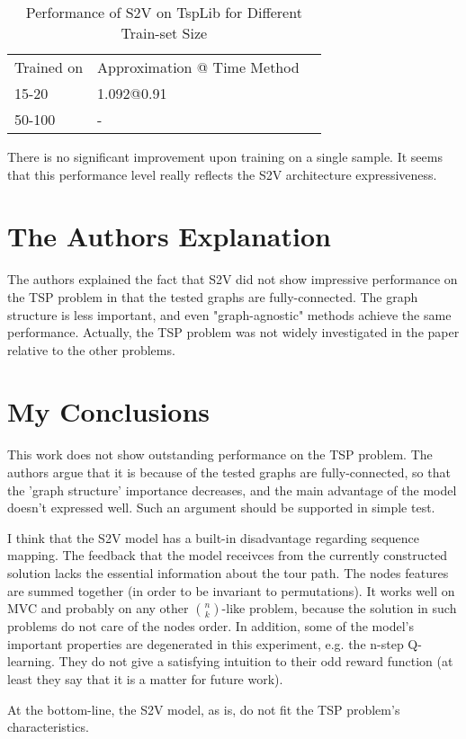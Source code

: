 \documentclass[10pt,a4paper,draft]{article}
\begin{document}
\begin{table}[h] \centering
	\begin{tabular}{lll}
	 	Trained on		& Approximation @ Time Method 	\\
	 	15-20	 		& 1.092@0.91					\\
		50-100			& - 
	\end{tabular}
	\caption{Performance of S2V on TspLib for Different Train-set Size} 
	\label{tb_tsp2d_performance_s2v}
\end{table}

There is no significant improvement upon training on a single sample. It seems that this performance level really reflects the S2V architecture expressiveness.
	


\section{The Authors Explanation}
	The authors explained the fact that S2V did not show impressive performance on the TSP problem in that the tested graphs are fully-connected. The graph structure is less important, and even "graph-agnostic" methods achieve the same performance. 
	Actually, the TSP problem was not widely investigated in the paper relative to the other problems.

\section{My Conclusions}
	This work does not show outstanding performance on the TSP problem. The authors argue that it is because of the tested graphs are fully-connected, so that the 'graph structure' importance decreases, and the main advantage of the model doesn't expressed well. Such an argument should be supported in simple test. 
	
	I think that the S2V model has a built-in disadvantage regarding sequence mapping. The feedback that the model receivces from the currently constructed solution lacks the essential information about the tour path. The nodes features are summed together (in order to be invariant to permutations). It works well on MVC and probably on any other ${n \choose k}$-like problem, because the solution in such problems do not care of the nodes order. 
	In addition, some of the model's important properties are degenerated in this experiment, e.g. the n-step Q-learning. They do not give a satisfying intuition to their odd reward function (at least they say that it is a matter for future work).
	
	At the bottom-line, the S2V model, as is, do not fit the TSP problem's characteristics. 




\end{document}
